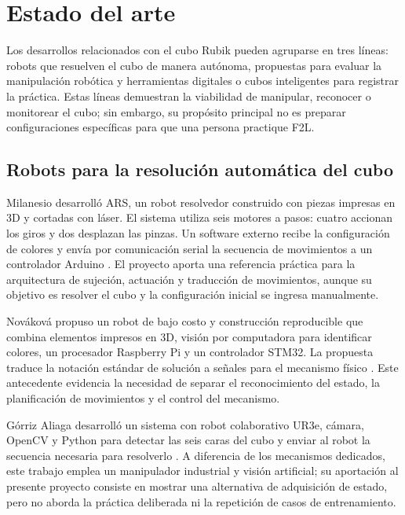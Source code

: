 \section{Estado del arte}

Los desarrollos relacionados con el cubo Rubik pueden agruparse en tres líneas: robots que resuelven el cubo de manera autónoma, propuestas para evaluar la manipulación robótica y herramientas digitales o cubos inteligentes para registrar la práctica. Estas líneas demuestran la viabilidad de manipular, reconocer o monitorear el cubo; sin embargo, su propósito principal no es preparar configuraciones específicas para que una persona practique F2L.

\subsection{Robots para la resolución automática del cubo}

Milanesio desarrolló ARS, un robot resolvedor construido con piezas impresas en 3D y cortadas con láser. El sistema utiliza seis motores a pasos: cuatro accionan los giros y dos desplazan las pinzas. Un software externo recibe la configuración de colores y envía por comunicación serial la secuencia de movimientos a un controlador Arduino \cite{Milanesio2019}. El proyecto aporta una referencia práctica para la arquitectura de sujeción, actuación y traducción de movimientos, aunque su objetivo es resolver el cubo y la configuración inicial se ingresa manualmente.

Nováková propuso un robot de bajo costo y construcción reproducible que combina elementos impresos en 3D, visión por computadora para identificar colores, un procesador Raspberry Pi y un controlador STM32. La propuesta traduce la notación estándar de solución a señales para el mecanismo físico \cite{Novakova2018}. Este antecedente evidencia la necesidad de separar el reconocimiento del estado, la planificación de movimientos y el control del mecanismo.

Górriz Aliaga desarrolló un sistema con robot colaborativo UR3e, cámara, OpenCV y Python para detectar las seis caras del cubo y enviar al robot la secuencia necesaria para resolverlo \cite{Gorriz2023}. A diferencia de los mecanismos dedicados, este trabajo emplea un manipulador industrial y visión artificial; su aportación al presente proyecto consiste en mostrar una alternativa de adquisición de estado, pero no aborda la práctica deliberada ni la repetición de casos de entrenamiento.

